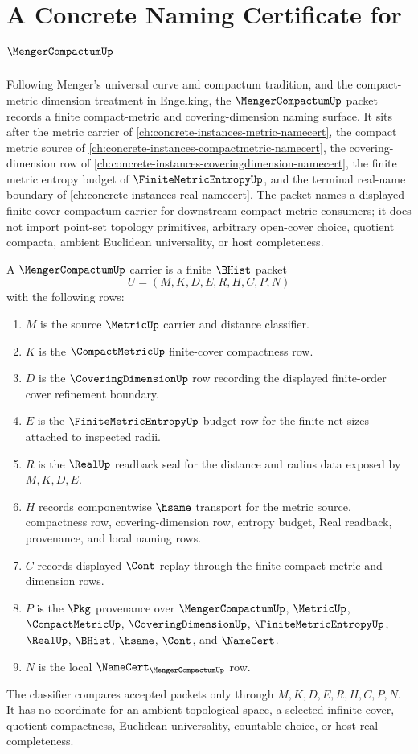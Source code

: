 \chapter{A Concrete Naming Certificate for $\MengerCompactumUp$}
\label{ch:concrete-instances-menger-compactum-namecert}

Following Menger's universal curve and compactum tradition, and the compact-metric dimension treatment in Engelking, the $\MengerCompactumUp$ packet records a finite compact-metric and covering-dimension naming surface. It sits after the metric carrier of \autoref{ch:concrete-instances-metric-namecert}, the compact metric source of \autoref{ch:concrete-instances-compactmetric-namecert}, the covering-dimension row of \autoref{ch:concrete-instances-coveringdimension-namecert}, the finite metric entropy budget of $\FiniteMetricEntropyUp$, and the terminal real-name boundary of \autoref{ch:concrete-instances-real-namecert}. The packet names a displayed finite-cover compactum carrier for downstream compact-metric consumers; it does not import point-set topology primitives, arbitrary open-cover choice, quotient compacta, ambient Euclidean universality, or host completeness.

\begin{definition}
\label{def:menger-compactum-carrier}
A $\MengerCompactumUp$ carrier is a finite $\BHist$ packet
$$
U=(M,K,D,E,R,H,C,P,N)
$$
with the following rows:
\begin{enumerate}
\item $M$ is the source $\MetricUp$ carrier and distance classifier.
\item $K$ is the $\CompactMetricUp$ finite-cover compactness row.
\item $D$ is the $\CoveringDimensionUp$ row recording the displayed finite-order cover refinement boundary.
\item $E$ is the $\FiniteMetricEntropyUp$ budget row for the finite net sizes attached to inspected radii.
\item $R$ is the $\RealUp$ readback seal for the distance and radius data exposed by $M,K,D,E$.
\item $H$ records componentwise $\hsame$ transport for the metric source, compactness row, covering-dimension row, entropy budget, Real readback, provenance, and local naming rows.
\item $C$ records displayed $\Cont$ replay through the finite compact-metric and dimension rows.
\item $P$ is the $\Pkg$ provenance over $\MengerCompactumUp$, $\MetricUp$, $\CompactMetricUp$, $\CoveringDimensionUp$, $\FiniteMetricEntropyUp$, $\RealUp$, $\BHist$, $\hsame$, $\Cont$, and $\NameCert$.
\item $N$ is the local $\NameCert_{\MengerCompactumUp}$ row.
\end{enumerate}
The classifier compares accepted packets only through $M,K,D,E,R,H,C,P,N$. It has no coordinate for an ambient topological space, a selected infinite cover, quotient compactness, Euclidean universality, countable choice, or host real completeness.
\end{definition}

